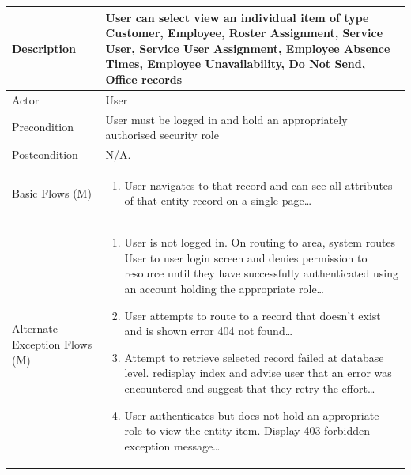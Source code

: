 \documentclass[a4paper,12pt]{article}
\newcommand\addrow[2]{#1 &#2\\ }
\newcommand\addheading[2]{#1 &#2\\ \hline}
\newcommand\tabularhead{\begin{tabular}{lp{8cm}}
\hline
}
\newcommand\addmulrow[2]{ \begin{minipage}[t][][t]{2.5cm}#1\end{minipage}%
   &\begin{minipage}[t][][t]{8cm}
    \begin{enumerate} #2   \end{enumerate}
    \end{minipage}\\ }
\newenvironment{usecase}{\tabularhead}
{\hline\end{tabular}}
\begin{document}
\begin{samepage}
\begin{usecase}
  \addheading{Description}{User can select view an individual item of type Customer, Employee, Roster Assignment, Service User, Service User Assignment, Employee Absence Times, Employee Unavailability, Do Not Send, Office records}
  \addheading{Actor}{User} 
  \addrow{Precondition}{User must be logged in and hold an appropriately authorised security role}
  \addrow{Postcondition}{N/A.}
  \addmulrow{Basic Flows (M)}{\item User navigates to that record and can see all attributes of that entity record on a single page\ldots}
  \addmulrow{Alternate Exception Flows (M)}{\item User is not logged in. On routing to area, system routes User to user login screen and denies permission to resource until they have successfully authenticated using an account holding the appropriate role\ldots
                                   \item User attempts to route to a record that doesn't exist and is shown error 404 not found\ldots
                                   \item Attempt to retrieve selected record failed at database level. redisplay index and advise user that an error was encountered and suggest that they retry the effort\ldots
                                    \item User authenticates but does not hold an appropriate role to view the entity item. Display 403 forbidden exception message\ldots}

\end{usecase}


\end{samepage}
\end{document}
